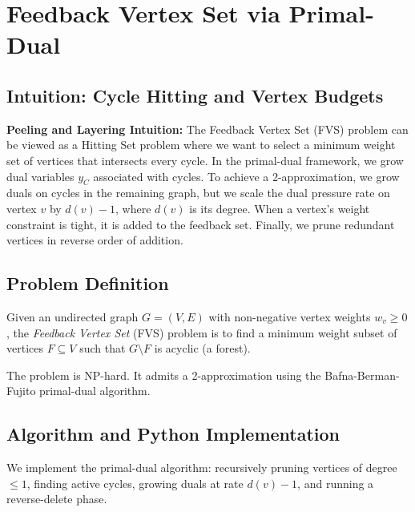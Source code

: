 \setcounter{chapter}{22}
\chapter{Feedback Vertex Set via Primal-Dual}
\label{ch:fvs_primal_dual}

\section{Intuition: Cycle Hitting and Vertex Budgets}

\begin{intuitionbox}
\textbf{Peeling and Layering Intuition:} The Feedback Vertex Set (FVS) problem can be viewed as a Hitting Set problem where we want to select a minimum weight set of vertices that intersects every cycle. In the primal-dual framework, we grow dual variables $y_C$ associated with cycles. To achieve a 2-approximation, we grow duals on cycles in the remaining graph, but we scale the dual pressure rate on vertex $v$ by $d(v) - 1$, where $d(v)$ is its degree. When a vertex's weight constraint is tight, it is added to the feedback set. Finally, we prune redundant vertices in reverse order of addition.
\end{intuitionbox}

\section{Problem Definition}
Given an undirected graph $G = (V, E)$ with non-negative vertex weights $w_v \ge 0$, the \emph{Feedback Vertex Set} (FVS) problem is to find a minimum weight subset of vertices $F \subseteq V$ such that $G \setminus F$ is acyclic (a forest).

The problem is NP-hard. It admits a 2-approximation using the Bafna-Berman-Fujito primal-dual algorithm.

\section{Algorithm and Python Implementation}
We implement the primal-dual algorithm: recursively pruning vertices of degree $\le 1$, finding active cycles, growing duals at rate $d(v) - 1$, and running a reverse-delete phase.


